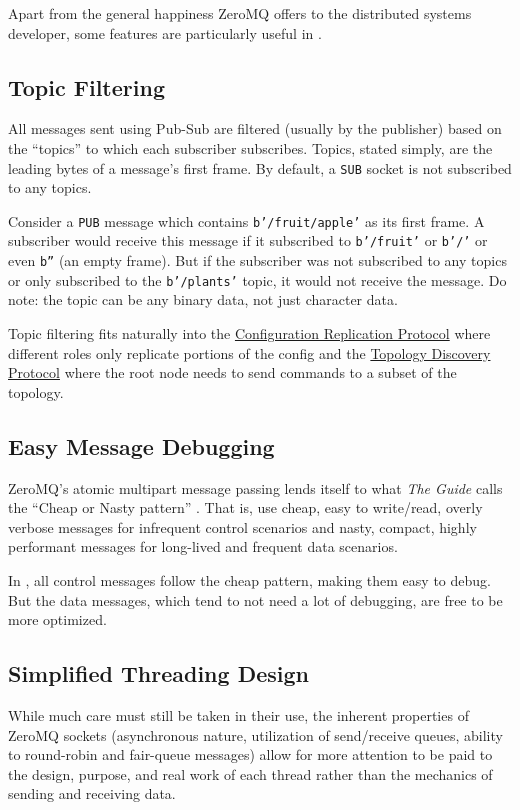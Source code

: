 Apart from the general happiness ZeroMQ offers to the distributed systems developer, some features are particularly
useful in \dcampns.

\subsection{Topic Filtering}

All messages sent using Pub-Sub are filtered (usually by the publisher) based on the ``topics'' to which each subscriber
subscribes. Topics, stated simply, are the leading bytes of a message's first frame. By default, a \texttt{SUB} socket
is not subscribed to any topics.

Consider a \texttt{PUB} message which contains \texttt{b'/fruit/apple'} as its first frame. A subscriber would receive
this message if it subscribed to \texttt{b'/fruit'} or \texttt{b'/'} or even \texttt{b''} (an empty frame). But if the
subscriber was not subscribed to any topics or only subscribed to the \texttt{b'/plants'} topic, it would not receive
the message. Do note: the topic can be any binary data, not just character data.

Topic filtering fits naturally into the \hyperref[proto_config]{Configuration Replication Protocol} where different
roles only replicate portions of the config and the \hyperref[proto_topo]{Topology Discovery Protocol} where the root
node needs to send commands to a subset of the topology.

\subsection{Easy Message Debugging}

ZeroMQ's atomic multipart message passing lends itself to what \textit{The Guide} calls the ``Cheap or Nasty pattern''
\cite{zguide}. That is, use cheap, easy to write/read, overly verbose messages for infrequent control scenarios and
nasty, compact, highly performant messages for long-lived and frequent data scenarios.

In \dcampns, all control messages follow the cheap pattern, making them easy to debug. But the data messages, which tend
to not need a lot of debugging, are free to be more optimized.

\subsection{Simplified Threading Design}

While much care must still be taken in their use, the inherent properties of ZeroMQ sockets (asynchronous nature,
utilization of send/receive queues, ability to round-robin and fair-queue messages) allow for more attention to be paid
to the design, purpose, and real work of each thread rather than the mechanics of sending and receiving data.

